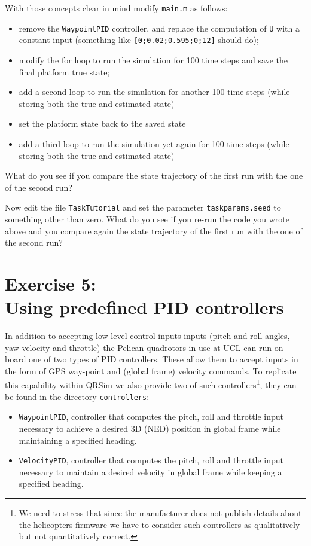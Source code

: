 \documentclass[a4paper,11pt]{article}
\begin{document}
With those concepts clear in mind modify \texttt{main.m} as follows:
\begin{itemize}
\item remove the \texttt{WaypointPID} controller, and replace the computation of \texttt{U} with a constant input (something like \texttt{[0;0.02;0.595;0;12]} should do);
\item modify the for loop to run the simulation for 100 time steps and save the final platform true state;
\item add a second loop to run the simulation for another 100 time steps (while storing both the true and estimated state)
\item set the platform state back to the saved state
\item add a third loop to run the simulation yet again for 100 time steps (while storing both the true and estimated state)
\end{itemize}
What do you see if you compare the state trajectory of the first run with the one of the second run? 

Now edit the file \texttt{TaskTutorial} and set the parameter \texttt{taskparams.seed} to something other than zero. 
What do you see if you re-run the code you wrote above and you compare again the state trajectory of the first run with the one of the second run? 


\section*{Exercise 5:\\Using predefined PID controllers}

In addition to accepting low level control inputs inputs (pitch and roll angles, yaw velocity and throttle) the Pelican quadrotors in use at UCL can run on-board one of two types of PID controllers. These allow them to accept inputs in the form of GPS way-point and (global frame) velocity commands. 
To replicate this capability within QRSim we also provide two of such controllers\footnote{We need to stress that since the manufacturer does not publish details about the helicopters firmware we have to consider such controllers as qualitatively but not quantitatively correct.}, they can be found in the directory \texttt{controllers}:
\begin{itemize}
\item \texttt{WaypointPID}, controller that computes the pitch, roll and throttle input necessary to achieve a desired 3D (NED) position in global frame while maintaining a specified heading.
\item \texttt{VelocityPID}, controller that computes the pitch, roll and throttle input necessary to maintain a desired velocity in global frame while keeping a specified heading.
\end{itemize}
\end{document}
